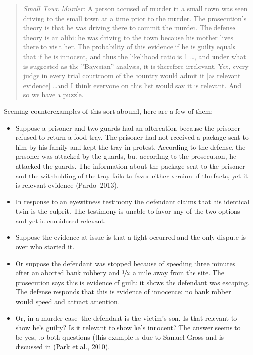 \documentclass[10pt,dvipsnames,enabledeprecatedfontcommands]{scrartcl}
\begin{document}
\begin{quote}
    \emph{Small Town Murder:} A person accused of murder in a small town was seen driving to the small town at a time prior to the murder. The prosecution's theory is that he was driving there to commit the murder. The defense theory is an alibi: he was driving to the town because his mother lives there to visit her. The probability of this evidence if he is guilty equals that if he is innocent, and thus the likelihood ratio is 1 \dots , and under what is suggested as the ''Bayesian'' analysis, it is therefore irrelevant. 
    Yet, every judge in every trial courtroom of the country would admit it [as relevant evidence] \dots and I think everyone on this list would say it is relevant.  And so we have a puzzle.  
    \end{quote}

\noindent  Seeming counterexamples of this sort abound, here are a few
of them:

\begin{itemize}
\item
  Suppose a prisoner and two guards had an altercation because the
  prisoner refused to return a food tray. The prisoner had not received
  a package sent to him by his family and kept the tray in protest.
  According to the defense, the prisoner was attacked by the guards, but
  according to the prosecution, he attacked the guards. The information
  about the package sent to the prisoner and the withholding of the tray
  fails to favor either version of the facts, yet it is relevant
  evidence (Pardo, 2013).
\item
  In response to an eyewitness testimony the defendant claims that his
  identical twin is the culprit. The testimony is unable to favor any of
  the two options and yet is considered relevant.
\item
  Suppose the evidence at issue is that a fight occurred and the only
  dispute is over who started it.
\item
  Or suppose the defendant was stopped because of speeding three minutes
  after an aborted bank robbery and \(\nicefrac{1}{2}\) a mile away from
  the site. The prosecution says this is evidence of guilt: it shows the
  defendant was escaping. The defense responds that this is evidence of
  innocence: no bank robber would speed and attract attention.
\item
  Or, in a murder case, the defendant is the victim's son. Is that
  relevant to show he's guilty? Is it relevant to show he's innocent?
  The answer seems to be yes, to both questions (this example is due to
  Samuel Gross and is discussed in (Park et al., 2010).
\end{itemize}
\end{document}
